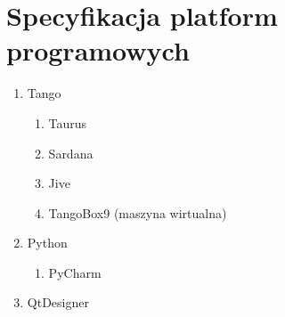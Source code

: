 \clearpage
\section{Specyfikacja platform programowych}
\label{sec:spec_prog}

\begin{enumerate}
	\item Tango
	\begin{enumerate}
		\item Taurus
		\item Sardana
		\item Jive
		\item TangoBox9 (maszyna wirtualna)
	\end{enumerate}
	\item Python
	\begin{enumerate}
		\item PyCharm
	\end{enumerate}
	\item QtDesigner
\end{enumerate}